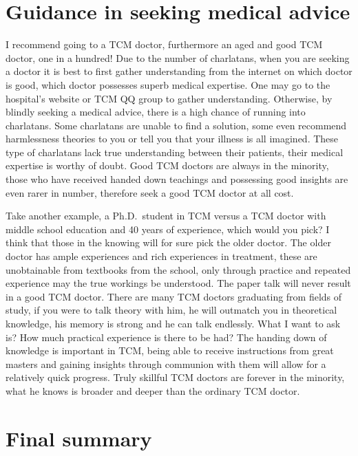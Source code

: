 \documentclass[
]{book}
\begin{document}
\hypertarget{guidance-in-seeking-medical-advice}{%
\section{Guidance in seeking medical advice}\label{guidance-in-seeking-medical-advice}}

I recommend going to a TCM doctor, furthermore an aged and good TCM doctor, one in a hundred! Due to the number of charlatans, when you are seeking a doctor it is best to first gather understanding from the internet on which doctor is good, which doctor possesses superb medical expertise. One may go to the hospital's website or TCM QQ group to gather understanding. Otherwise, by blindly seeking a medical advice, there is a high chance of running into charlatans. Some charlatans are unable to find a solution, some even recommend harmlessness theories to you or tell you that your illness is all imagined. These type of charlatans lack true understanding between their patients, their medical expertise is worthy of doubt. Good TCM doctors are always in the minority, those who have received handed down teachings and possessing good insights are even rarer in number, therefore seek a good TCM doctor at all cost.

Take another example, a Ph.D.~student in TCM versus a TCM doctor with middle school education and 40 years of experience, which would you pick? I think that those in the knowing will for sure pick the older doctor. The older doctor has ample experiences and rich experiences in treatment, these are unobtainable from textbooks from the school, only through practice and repeated experience may the true workings be understood. The paper talk will never result in a good TCM doctor. There are many TCM doctors graduating from fields of study, if you were to talk theory with him, he will outmatch you in theoretical knowledge, his memory is strong and he can talk endlessly. What I want to ask is? How much practical experience is there to be had? The handing down of knowledge is important in TCM, being able to receive instructions from great masters and gaining insights through communion with them will allow for a relatively quick progress. Truly skillful TCM doctors are forever in the minority, what he knows is broader and deeper than the ordinary TCM doctor.

\hypertarget{final-summary}{%
\section{Final summary}\label{final-summary}}
\end{document}
